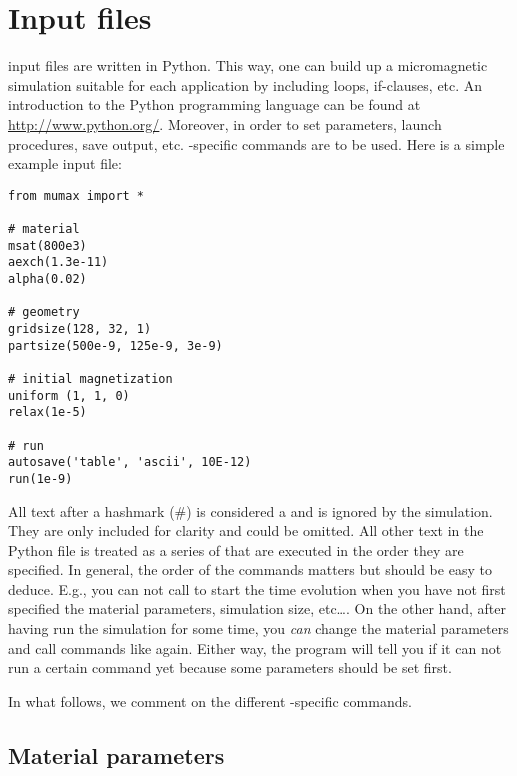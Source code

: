 \section{Input files}


\mumax input files are written in Python. This way, one can build up a micromagnetic simulation suitable for each application by including loops, if-clauses, etc.  An introduction to the Python programming language can be found at \url{http://www.python.org/}.  Moreover, in order to set parameters, launch procedures, save output, etc. \mumax-specific commands are to be used.  Here is a simple example input file: 

\begin{verbatim}
from mumax import *

# material
msat(800e3)
aexch(1.3e-11)
alpha(0.02)

# geometry 
gridsize(128, 32, 1)
partsize(500e-9, 125e-9, 3e-9)

# initial magnetization
uniform	(1, 1, 0)
relax(1e-5)

# run
autosave('table', 'ascii', 10E-12)
run(1e-9)
\end{verbatim}                                                                                                                                            

All text after a hashmark (\#) is considered a  and is ignored by the simulation.  They are only included for clarity and could be omitted.  All other text in the Python file is treated as a series of  that are executed in the order they are specified. In general, the order of the commands matters but should be easy to deduce.  E.g., you can not call  to start the time evolution when you have not first specified the material parameters, simulation size, etc\ldots. On the other hand, after having {run} the simulation for some time, you \emph{can} change the material parameters and call commands like  again. Either way, the program will tell you if it can not run a certain command yet because some parameters should be set first.

In what follows, we comment on the different \mumax-specific commands.

\subsection{Material parameters}

